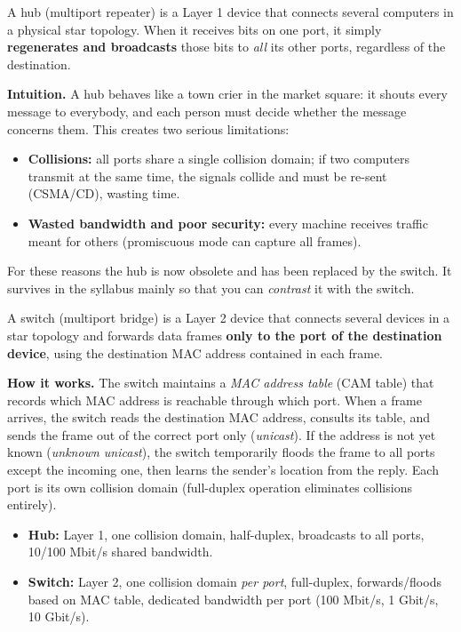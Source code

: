 \documentclass[11pt]{article}
\newcommand{\cle}[1]{{\popxbold\color{popdark}#1}}
\newcounter{popsec}
\newcounter{popsub}
\newcommand{\courssub}[1]{%
  \stepcounter{popsub}%
  \par\vspace{9pt}\noindent{\popxbold\fontsize{11.5}{13}\selectfont\color{popink}{\color{poporange}\thepopsec.\thepopsub}\hspace{6pt}#1}\par\nopagebreak\vspace{4pt}
}
\begin{document}
\courssub{The Hub}

\begin{definition}[Hub]
A \cle{hub} (multiport repeater) is a Layer 1 device that connects several computers in a physical star topology. When it receives bits on one port, it simply \textbf{regenerates and broadcasts} those bits to \emph{all} its other ports, regardless of the destination.
\end{definition}

\textbf{Intuition.} A hub behaves like a town crier in the market square: it shouts every message to everybody, and each person must decide whether the message concerns them. This creates two serious limitations:
\begin{itemize}
\item \textbf{Collisions:} all ports share a single \cle{collision domain}; if two computers transmit at the same time, the signals collide and must be re-sent (CSMA/CD), wasting time.
\item \textbf{Wasted bandwidth and poor security:} every machine receives traffic meant for others (promiscuous mode can capture all frames).
\end{itemize}
For these reasons the hub is now \cle{obsolete} and has been replaced by the switch. It survives in the syllabus mainly so that you can \emph{contrast} it with the switch.

\courssub{The Switch}

\begin{definition}[Switch]
A \cle{switch} (multiport bridge) is a Layer 2 device that connects several devices in a star topology and forwards data frames \textbf{only to the port of the destination device}, using the destination \cle{MAC address} contained in each frame.
\end{definition}

\textbf{How it works.} The switch maintains a \emph{MAC address table} (CAM table) that records which MAC address is reachable through which port. When a frame arrives, the switch reads the destination MAC address, consults its table, and sends the frame out of the correct port only (\emph{unicast}). If the address is not yet known (\emph{unknown unicast}), the switch temporarily floods the frame to all ports except the incoming one, then learns the sender's location from the reply. Each port is its own collision domain (full-duplex operation eliminates collisions entirely).

\begin{propriete}
\begin{itemize}
\item \textbf{Hub:} Layer 1, one collision domain, half-duplex, broadcasts to all ports, 10/100 Mbit/s shared bandwidth.
\item \textbf{Switch:} Layer 2, one collision domain \emph{per port}, full-duplex, forwards/floods based on MAC table, dedicated bandwidth per port (100 Mbit/s, 1 Gbit/s, 10 Gbit/s).
\end{itemize}
\end{propriete}
\end{document}
